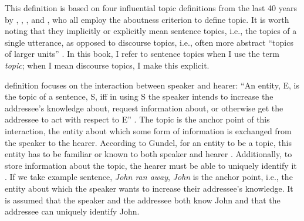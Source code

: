 This definition is based on four influential topic definitions from the last 40 years by \citet{reinhart1981}, \citet{gundel1988}, \citet{lambrecht1994}, and \citet{krifka2007}, who all employ the aboutness criterion to define topic.
It is worth noting that they implicitly or explicitly mean sentence topics, i.e., the topics of a single utterance, as opposed to discourse topics,  i.e., often more abstract ``topics of larger units'' \citep[54]{reinhart1981}.
In this book, I refer to sentence topics when I use the term \textit{topic}; when I mean discourse topics, I make this explicit.

 definition focuses on the interaction between speaker and hearer:
``An entity, E, is the topic of a sentence, S, iff in using S the speaker intends to increase the addressee's knowledge about, request information about, or otherwise get the addressee to act with respect to E'' \citep[210]{gundel1988}.
The topic is the anchor point of this interaction, the entity about which some form of information is exchanged from the speaker to the hearer.
According to Gundel, for an entity to be a topic, this entity has to be familiar or known to both speaker and hearer \citep[212]{gundel1988}.
Additionally, to store information about the topic, the hearer must be able to uniquely identify it \citep[214]{gundel1988}.
If we take  example sentence, \textit{John ran away}, \textit{John} is the anchor point, i.e., the entity about which the speaker wants to increase their addressee's knowledge.
It is assumed that the speaker and the addressee both know John and that the addressee can uniquely identify John.

